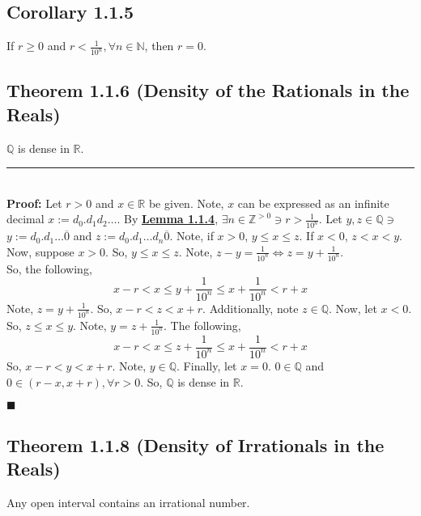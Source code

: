 \documentclass[11pt]{book}
\newcommand{\R}{\mathbb{R}}
\newcommand{\N}{\mathbb{N}}
\newcommand{\Q}{\mathbb{Q}}
\newcommand{\Z}{\mathbb{Z}}
\newcommand{\horline}{\noindent\rule{14.25cm}{0.6pt}\\}
\newcounter{theorem}
\newcounter{lemma}
\newcommand{\QED}{\begin{flushright}$\blacksquare$\end{flushright}}
\begin{document}
	\subsection{Corollary 1.1.5}
	\label{subsec:cor115}
		\begin{cor}
			If $r \geq 0$ and $r < \frac{1}{10^n}, \forall n \in \N$, then $r = 0$.
		\end{cor}
	\subsection{Theorem 1.1.6 (Density of the Rationals in the Reals)}
	\label{subsec:theorem116}
		\begin{theor}
			$\Q$ is dense in $\R$.\hfill\break
			\horline
			\textbf{Proof:} Let $r>0$ and $x \in \R$ be given. Note, $x$ can be expressed as an infinite
			decimal $x := d_0.d_1d_2\dots$. By \hyperref[subsec:lemma114]{\textbf{Lemma 1.1.4}}, $\exists n \in \Z^{>0} \ni r > \frac{1}{10^n}$.
			Let $y,z \in \Q \ni$ $y := d_0.d_1\dots \overline{0}$ and $z := d_0.d_1\dots d_n \overline{0}$. Note,
			if $x > 0$, $y \leq x \leq z$. If $x < 0$, $z < x < y$.\hfill\break
			Now, suppose $x > 0$. So, $y \leq x \leq z$. Note, $z - y = \frac{1}{10^n} \Leftrightarrow z = y + \frac{1}{10^n}$.\\
			So, the following,
			$$ x-r < x \leq y + \frac{1}{10^n} \leq x + \frac{1}{10^n} < r + x$$
			Note, $z = y + \frac{1}{10^n}$. So, $x - r < z < x+r$. Additionally, note $z \in \Q$.\hfill\break
			Now, let $x < 0$. So, $z \leq x \leq y$. Note, $y = z + \frac{1}{10^n}$. The following,
			$$x - r < x \leq z + \frac{1}{10^n} \leq x + \frac{1}{10^n} < r + x$$
			So, $x - r < y < x + r$. Note, $y \in \Q$. Finally, let $x = 0$. $0 \in \Q$ and $0 \in (r-x,x+r), \forall r > 0$.
			So, $\Q$ is dense in $\R$. \QED
		\end{theor}
	\subsection{Theorem 1.1.8 (Density of Irrationals in the Reals)}
	\label{subsec:theorem118}
		\begin{theor}
			Any open interval contains an irrational number.
		\end{theor}
\end{document}
